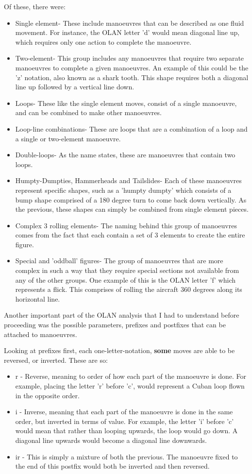 Of these, there were:
\begin{itemize}
	\item Single element- These include manoeuvres that can be described as one fluid movement. For instance, the OLAN letter 'd' would mean diagonal line up, which requires only one action to complete the manoeuvre.
	\item Two-element- This group includes any manoeuvres that require two separate manoeuvres to complete a given manoeuvres. An example of this could be the 'z' notation, also known as a shark tooth. This shape requires both a diagonal line up followed by a vertical line down. 
	\item Loops- These like the single element moves, consist of a single manoeuvre, and can be combined to make other manoeuvres.
	\item Loop-line combinations- These are loops that are a combination of a loop and a single or two-element manoeuvre.
	\item Double-loops- As the name states, these are manoeuvres that contain two loops.
	\item Humpty-Dumpties, Hammerheads and Tailslides- Each of these manoeuvres represent specific shapes, such as a 'humpty dumpty' which consists of a bump shape comprised of a 180 degree turn to come back down vertically. As the previous, these shapes can simply be combined from single element pieces. 
	\item Complex 3 rolling elements- The naming behind this group of manoeuvres comes from the fact that each contain a set of 3 elements to create the entire figure.
	\item Special and 'oddball' figures- The group of manoeuvres that are more complex in such a way that they require special sections not available from any of the other groups. One example of this is the OLAN letter 'f' which represents a flick. This comprises of rolling the aircraft 360 degrees along its horizontal line.
\end{itemize}

Another important part of the OLAN analysis that I had to understand before proceeding was the possible parameters, prefixes and postfixes that can be attached to manoeuvres. 

Looking at prefixes first, each one-letter-notation, \textbf{some} moves are able to be reversed, or inverted. These are so:
\begin{itemize}
	\item r - Reverse, meaning to order of how each part of the manoeuvre is done. For example, placing the letter 'r' before 'c', would represent a Cuban loop flown in the opposite order. 
	\item i - Inverse, meaning that each part of the manoeuvre is done in the same order, but inverted in terms of value. For example, the letter 'i' before 'c' would mean that rather than looping upwards, the loop would go down. A diagonal line upwards would become a diagonal line downwards.
	\item ir - This is simply a mixture of both the previous. The manoeuvre fixed to the end of this postfix would both be inverted and then reversed. 
\end{itemize}

